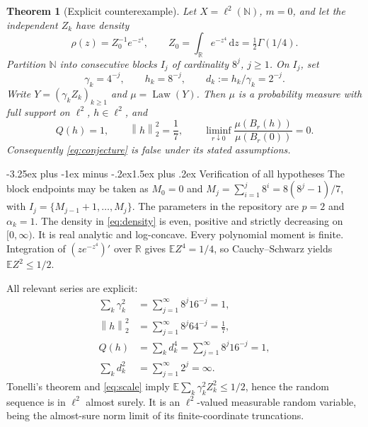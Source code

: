 \documentclass[11pt]{article}
\makeatletter
\renewcommand{\subsection}{\@startsection{subsection}{2}{0pt}
  {-3.25ex plus -1ex minus -.2ex}{1.5ex plus .2ex}
  {\normalfont\normalsize\bfseries}}
\newtheorem{theorem}{Theorem}[section]
\theoremstyle{remark}
\newcommand{\E}{\mathbb E}
\newcommand{\R}{\mathbb R}
\newcommand{\N}{\mathbb N}
\newcommand{\dd}{\,\mathrm d}
\newcommand{\norm}[1]{\left\lVert #1\right\rVert}
\newcommand{\law}{\operatorname{Law}}
\makeatother
\begin{document}
\begin{theorem}[Explicit counterexample]\label{thm:main}
Let $X=\ell^2(\N)$, $m=0$, and let the independent $Z_k$ have density
\begin{equation}\label{eq:density}
\rho(z)=Z_0^{-1}e^{-z^4},\qquad Z_0=\int_\R e^{-z^4}\dd z=\tfrac12\Gamma(1/4).
\end{equation}
Partition $\N$ into consecutive blocks $I_j$ of cardinality $8^j$, $j\ge1$. On $I_j$, set
\begin{equation}\label{eq:construction}
\gamma_k=4^{-j},\qquad h_k=8^{-j},\qquad d_k:=h_k/\gamma_k=2^{-j}.
\end{equation}
Write $Y=(\gamma_k Z_k)_{k\ge1}$ and $\mu=\law(Y)$. Then $\mu$ is a probability measure with full support on $\ell^2$, $h\in\ell^2$, and
\begin{equation}\label{eq:main}
Q(h)=1,\qquad \norm{h}_2^2=\frac17,\qquad
\liminf_{r\downarrow0}\frac{\mu(B_r(h))}{\mu(B_r(0))}=0.
\end{equation}
Consequently \eqref{eq:conjecture} is false under its stated assumptions.
\end{theorem}

\subsection{Verification of all hypotheses}
The block endpoints may be taken as $M_0=0$ and
$M_j=\sum_{i=1}^j8^i=8(8^j-1)/7$, with $I_j=\{M_{j-1}+1,\ldots,M_j\}$.
The parameters in the repository are $p=2$ and $\alpha_k=1$. The density in \eqref{eq:density} is even, positive and strictly decreasing on $[0,\infty)$. It is real analytic and log-concave. Every polynomial moment is finite.
Integration of $(z e^{-z^4})'$ over $\R$ gives $\E Z^4=1/4$, so Cauchy--Schwarz yields $\E Z^2\le1/2$.

All relevant series are explicit:
\begin{align}
\sum_k\gamma_k^2&=\sum_{j=1}^\infty8^j16^{-j}=1,\label{eq:scale}\\
\norm{h}_2^2&=\sum_{j=1}^\infty8^j64^{-j}=\frac17,\label{eq:hnorm}\\
Q(h)&=\sum_k d_k^4=\sum_{j=1}^\infty8^j16^{-j}=1,\label{eq:energy}\\
\sum_k d_k^2&=\sum_{j=1}^\infty2^j=\infty.\label{eq:notl2}
\end{align}
Tonelli's theorem and \eqref{eq:scale} imply
$\E\sum_k\gamma_k^2 Z_k^2\le1/2$, hence the random sequence is in $\ell^2$ almost surely. It is an $\ell^2$-valued measurable random variable, being the almost-sure norm limit of its finite-coordinate truncations.
\end{document}
